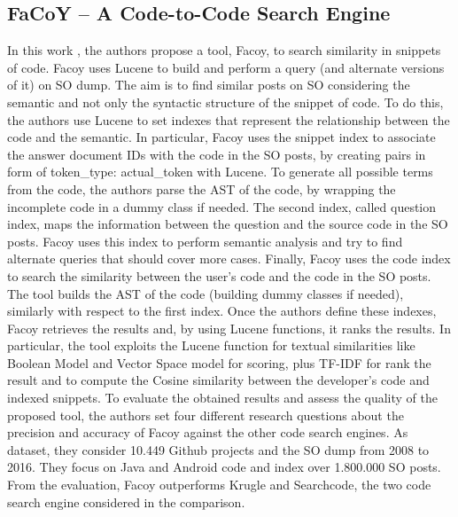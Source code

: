 \subsection{FaCoY – A Code-to-Code Search Engine}
In this work \cite{DBLP:conf/icse/KimKBC0KT18}, the authors propose a tool, Facoy,  to search similarity in snippets of code. Facoy uses Lucene to build and perform a query (and alternate versions of it) on SO dump. The aim is to find similar posts on SO considering the semantic and not only the syntactic structure of the snippet of code.  To do this,  the authors use Lucene to set indexes that represent the relationship between the code and the semantic. In particular, Facoy uses the snippet index to associate the answer document IDs with the code in the SO posts, by creating pairs in form of token\_type: actual\_token with Lucene. To generate all possible terms from the code, the authors parse the AST of the code, by wrapping the incomplete code in a dummy class if needed. The second index, called question index, maps the information between the question and the source code in the SO posts. Facoy uses this index to perform semantic analysis and try to find alternate queries that should cover more cases. Finally, Facoy uses the code index to search the similarity between the user's code and the code in the SO posts.  The tool builds the AST of the code (building dummy classes if needed), similarly with respect to the first index. Once the authors define these indexes, Facoy retrieves the results and, by using Lucene functions, it ranks the results. In particular, the tool exploits the Lucene function for textual similarities like Boolean Model and Vector Space model for scoring, plus TF-IDF for rank the result and to compute the Cosine similarity between the developer's code and indexed snippets. To evaluate the obtained results and assess the quality of the proposed tool, the authors set four different research questions about the precision and accuracy of Facoy against the other code search engines. As dataset, they consider 10.449 Github projects and the SO dump from 2008 to 2016. They focus on Java and Android code and index over 1.800.000 SO posts. From the evaluation, Facoy outperforms Krugle and Searchcode, the two code search engine considered in the comparison. 

